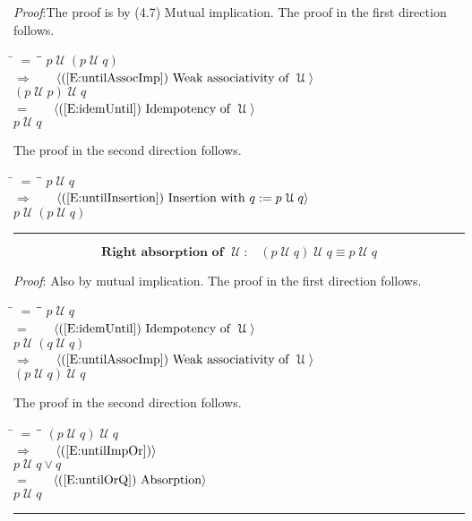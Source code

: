 \documentclass[12pt, fleqn, leqno]{article}
\newcommand{\lgap}{2pt}                             %
\newcommand{\mymathindent}{24pt}                    %
\newcommand{\impl}{\ensuremath{\Rightarrow}}        %
\newcommand{\Until}{\;\mathcal{U}\;}
\newcommand{\myqed}{\rule[-.23ex]{1.2ex}{2.0ex}}
\newcommand{\myqedtab}{\hspace{384pt}}              %
\newcommand{\Gll} {\langle}                         %
\newcommand{\Ggg} {\rangle}                         %
\newcommand{\Hint}[1]     {\ \ \ $\Gll              \mbox{#1} \Ggg$ }   %
\begin{document}
\emph{Proof}:The proof is by (4.7) Mutual implication.
The proof in the first direction follows.
\begin{tabbing}
\hspace{\mymathindent} \= $= \;$ \= \myqedtab \= \kill
  \> \>   $p \Until (p \Until q)$\\[\lgap]
  \> $\impl$  \>  \Hint{(\ref{E:untilAssocImp}) Weak associativity of $\Until$}\\[\lgap]
  \> \>   $(p \Until p) \Until q$\\[\lgap]
  \> $=$  \>  \Hint{(\ref{E:idemUntil}) Idempotency of $\Until$}\\[\lgap]
  \> \>   $p \Until q$
\end{tabbing}
The proof in the second direction follows.
\begin{tabbing}
\hspace{\mymathindent} \= $= \;$ \= \myqedtab \= \kill
  \> \>   $p \Until q$\\[\lgap]
  \> $\impl$  \>  \Hint{(\ref{E:untilInsertion}) Insertion with $q := p \Until q$}\\[\lgap]
  \> \>   $p \Until (p \Until q)$ \quad \myqed
\end{tabbing}
\begin{equation}\label{E:untilIdemR}
\textbf{Right absorption of $\Until$:}\quad (p \Until q) \Until q \equiv p \Until q
\end{equation}

\emph{Proof}: Also by mutual implication.
The proof in the first direction follows.
\begin{tabbing}
\hspace{\mymathindent} \= $= \;$ \= \myqedtab \= \kill
  \> \>   $p \Until q$\\[\lgap]
  \> $=$  \>  \Hint{(\ref{E:idemUntil}) Idempotency of $\Until$}\\[\lgap]
  \> \>   $p \Until (q \Until q)$\\[\lgap]
  \> $\impl$  \>  \Hint{(\ref{E:untilAssocImp}) Weak associativity of $\Until$}\\[\lgap]
  \> \>   $(p \Until q) \Until q$
\end{tabbing}
The proof in the second direction follows.
\begin{tabbing}
\hspace{\mymathindent} \= $= \;$ \= \myqedtab \= \kill
  \> \>   $(p \Until q) \Until q$\\[\lgap]
  \> $\impl$  \>  \Hint{(\ref{E:untilImpOr})}\\[\lgap]
  \> \>   $p \Until q \lor q$\\[\lgap]
  \> $=$  \>  \Hint{(\ref{E:untilOrQ}) Absorption}\\[\lgap]
  \> \>   $p \Until q$ \quad \myqed
\end{tabbing}
\end{document}
